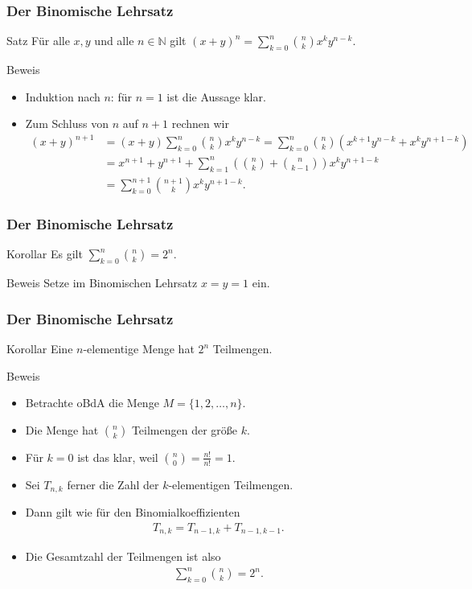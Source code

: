 \documentclass{beamer}
\newcommand\NN{\mathbb N}
\newcommand\bc[1]{\left({#1}\right)}
\renewcommand{\oe}{\"o}
\newcommand{\ue}{\"u}
\begin{document}
\begin{frame}\frametitle{Der Binomische Lehrsatz}
\begin{block}{Satz}
	F\ue r alle $x,y$ und alle $n\in\NN$ gilt $\displaystyle(x+y)^n=\sum_{k=0}^n\binom nkx^ky^{n-k}$.
\end{block}
\begin{block}{Beweis}
	\begin{itemize}
	\item Induktion nach $n$: f\ue r $n=1$ ist die Aussage klar.
	\item Zum Schluss von $n$ auf $n+1$ rechnen wir
		\begin{align*}
			(x+y)^{n+1}&=(x+y)\sum_{k=0}^n\binom nkx^ky^{n-k}=\sum_{k=0}^n\binom nk\bc{x^{k+1}y^{n-k}+x^ky^{n+1-k}}\\
					   &=x^{n+1}+y^{n+1}+\sum_{k=1}^n\bc{\binom nk+\binom n{k-1}}x^ky^{n+1-k}\\&=\sum_{k=0}^{n+1}\binom{n+1}kx^ky^{n+1-k}.
		\end{align*}
	\end{itemize}
\end{block}
\end{frame}

\begin{frame}\frametitle{Der Binomische Lehrsatz}
\begin{block}{Korollar}
	Es gilt $\sum_{k=0}^n\binom nk=2^n$.
\end{block}
\begin{block}{Beweis}
	Setze im Binomischen Lehrsatz $x=y=1$ ein.
\end{block}
\end{frame}

\begin{frame}\frametitle{Der Binomische Lehrsatz}
\begin{block}{Korollar}
	Eine $n$-elementige Menge hat $2^n$ Teilmengen.
\end{block}
\begin{block}{Beweis}
\begin{itemize}
	\item Betrachte oBdA die Menge $M=\{1,2,\ldots,n\}$.
\item Die Menge hat $\binom nk$ Teilmengen der gr\oe\ss e $k$.
\item F\ue r $k=0$ ist das klar, weil $\binom n0=\frac{n!}{n!}=1$.
\item Sei $T_{n,k}$ ferner die Zahl der $k$-elementigen Teilmengen.
\item Dann gilt wie f\ue r den Binomialkoeffizienten
	\begin{align*}
		T_{n,k}=T_{n-1,k}+T_{n-1,k-1}.
	\end{align*}
\item Die Gesamtzahl der Teilmengen ist also
	\begin{align*}
		\sum_{k=0}^n\binom nk=2^n.
	\end{align*}
\end{itemize}
\end{block}
\end{frame}
\end{document}
